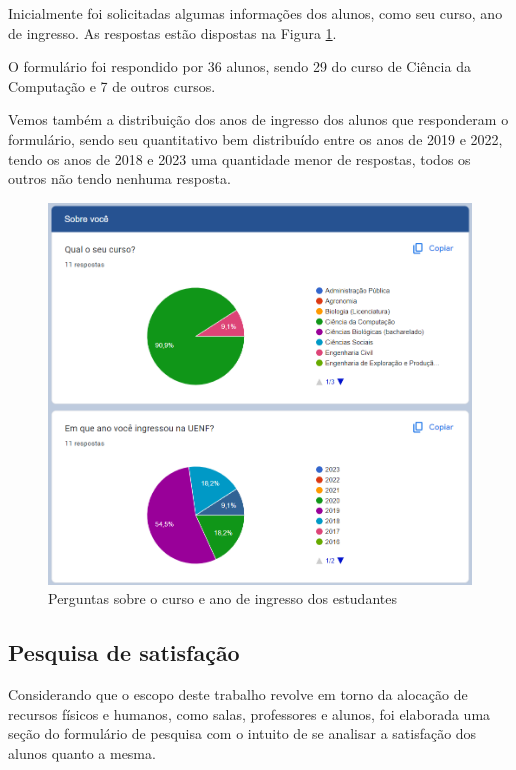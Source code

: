         Inicialmente foi solicitadas algumas informações dos alunos, como seu curso, ano de ingresso. As respostas estão dispostas na Figura \ref{fig:1_SobreVoce}.

        O formulário foi respondido por 36 alunos, sendo 29 do curso de Ciência da Computação e 7 de outros cursos.

        Vemos também a distribuição dos anos de ingresso dos alunos que responderam o formulário, sendo seu quantitativo bem distribuído entre os anos de 2019 e 2022, tendo os anos de 2018 e 2023 uma quantidade menor de respostas, todos os outros não tendo nenhuma resposta.

        \begin{figure}[htbp]\centering
            \caption{\label{fig:1_SobreVoce} Perguntas sobre o curso e ano de ingresso dos estudantes}
            \includegraphics[scale=0.8]{files/img/forms/1.0-SobreVoce.png}
        \end{figure} %

    \subsection{Pesquisa de satisfação} %

        Considerando que o escopo deste trabalho revolve em torno da alocação de recursos físicos e humanos, como salas, professores e alunos, foi elaborada uma seção do formulário de pesquisa com o intuito de se analisar a satisfação dos alunos quanto a mesma.

